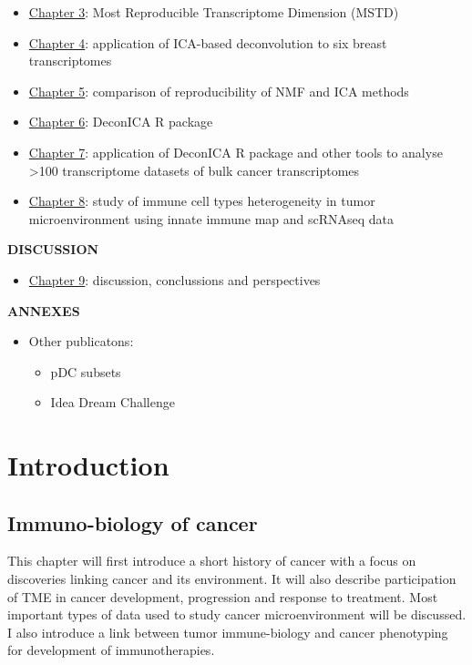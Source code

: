 \documentclass[12pt,]{book}
\providecommand{\tightlist}{%
  \setlength{\itemsep}{0pt}\setlength{\parskip}{0pt}}
\theoremstyle{definition}
\theoremstyle{definition}
\theoremstyle{definition}
\theoremstyle{remark}
\begin{document}
\begin{itemize}
\tightlist
\item
  \href{}{Chapter 3}: Most Reproducible Transcriptome Dimension (MSTD)
\item
  \href{}{Chapter 4}: application of ICA-based deconvolution to six
  breast transcriptomes
\item
  \protect\hyperlink{sens}{Chapter 5}: comparison of reproducibility of
  NMF and ICA methods
\item
  \href{}{Chapter 6}: DeconICA R package
\item
  \href{}{Chapter 7}: application of DeconICA R package and other tools
  to analyse \textgreater{}100 transcriptome datasets of bulk cancer
  transcriptomes
\item
  \protect\hyperlink{map}{Chapter 8}: study of immune cell types
  heterogeneity in tumor microenvironment using innate immune map and
  scRNAseq data
\end{itemize}

\textbf{DISCUSSION}

\begin{itemize}
\tightlist
\item
  \protect\hyperlink{conclusions}{Chapter 9}: discussion, conclussions
  and perspectives
\end{itemize}

\textbf{ANNEXES}

\begin{itemize}
\tightlist
\item
  Other publicatons:

  \begin{itemize}
  \tightlist
  \item
    pDC subsets
  \item
    Idea Dream Challenge
  \end{itemize}
\end{itemize}

\hypertarget{part-introduction}{%
\part{Introduction}\label{part-introduction}}

\hypertarget{intro}{%
\chapter{Immuno-biology of cancer}\label{intro}}

This chapter will first introduce a short history of cancer with a focus
on discoveries linking cancer and its environment. It will also describe
participation of TME in cancer development, progression and response to
treatment. Most important types of data used to study cancer
microenvironment will be discussed. I also introduce a link between
tumor immune-biology and cancer phenotyping for development of
immunotherapies.
\end{document}
